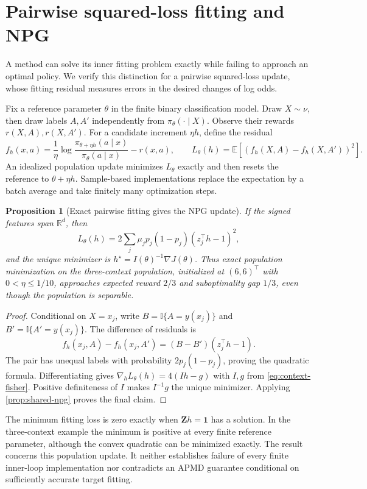 \documentclass[11pt,twoside]{article}
\newcommand{\E}{\mathbb E}
\newcommand{\I}{\mathbb I}
\newcommand{\R}{\mathbb R}
\newtheorem{proposition}[theorem]{Proposition}
\theoremstyle{definition}
\theoremstyle{remark}
\begin{document}
\section{Pairwise squared-loss fitting and NPG}
\label{app:rebel}

A method can solve its inner fitting problem exactly while failing to
approach an optimal policy. We verify this distinction for a pairwise
squared-loss update, whose fitting residual measures errors in the desired
changes of log odds.

Fix a reference parameter $\theta$ in the finite binary classification
model. Draw $X\sim\nu$, then draw labels $A,A'$ independently from
$\pi_\theta(\cdot\mid X)$. Observe their rewards
$r(X,A),r(X,A')$. For a candidate increment $\eta h$, define the residual
\[
 f_h(x,a)=\frac1\eta\log\frac{\pi_{\theta+\eta h}(a\mid x)}
 {\pi_\theta(a\mid x)}-r(x,a),
 \qquad L_\theta(h)=\E[(f_h(X,A)-f_h(X,A'))^2].
\]
An idealized population update minimizes $L_\theta$ exactly and then resets
the reference to $\theta+\eta h$. Sample-based implementations replace the
expectation by a batch average and take finitely many optimization steps.

\begin{proposition}[Exact pairwise fitting gives the NPG update]
\label{prop:pairwise-npg}
If the signed features span $\R^d$, then
\[
 L_\theta(h)=2\sum_j\mu_j p_j(1-p_j)(z_j^\top h-1)^2,
\]
and the unique minimizer is $h^\star=I(\theta)^{-1}\nabla J(\theta)$.
Thus exact population minimization on the three-context population,
initialized at $(6,6)^\top$ with $0<\eta\le1/10$, approaches expected reward
$2/3$ and suboptimality gap $1/3$, even though the population is separable.
\end{proposition}
\begin{proof}
Conditional on $X=x_j$, write $B=\I\{A=y(x_j)\}$ and
$B'=\I\{A'=y(x_j)\}$. The difference of residuals is
\[
 f_h(x_j,A)-f_h(x_j,A')=(B-B')(z_j^\top h-1).
\]
The pair has unequal labels with probability $2p_j(1-p_j)$, proving
the quadratic formula. Differentiating gives
$\nabla_h L_\theta(h)=4(Ih-g)$ with $I,g$ from
\cref{eq:context-fisher}. Positive definiteness of $I$ makes $I^{-1}g$
the unique minimizer. Applying \cref{prop:shared-npg} proves the final claim.
\end{proof}

The minimum fitting loss is zero exactly when $\mathbf Z h=\mathbf1$ has a
solution. In the three-context example the minimum is positive at every
finite reference parameter, although the convex quadratic can be minimized
exactly. The result concerns this population update. It neither establishes
failure of every finite inner-loop implementation nor contradicts an APMD
guarantee conditional on sufficiently accurate target fitting.
\end{document}
